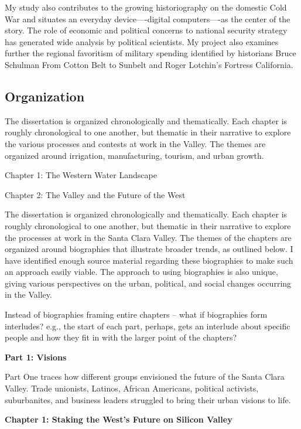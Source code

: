 \documentclass[11pt,article,oneside]{memoir}
\begin{document}
My study also contributes to the growing historiography on the domestic
Cold War and situates an everyday device----digital computers----as the
center of the story. The role of economic and political concerns to
national security strategy has generated wide analysis by political
scientists. My project also examines further the regional favoritism of
military spending identified by historians Bruce Schulman From Cotton
Belt to Sunbelt and Roger Lotchin's Fortress California.

\subsection{Organization}

The dissertation is organized chronologically and thematically. Each
chapter is roughly chronological to one another, but thematic in their
narrative to explore the various processes and contests at work in the
Valley. The themes are organized around irrigation, manufacturing,
tourism, and urban growth.

Chapter 1: The Western Water Landscape

Chapter 2: The Valley and the Future of the West

The dissertation is organized chronologically and thematically. Each
chapter is roughly chronological to one another, but thematic in their
narrative to explore the processes at work in the Santa Clara Valley.
The themes of the chapters are organized around biographies that
illustrate broader trends, as outlined below. I have identified enough
source material regarding these biographies to make such an approach
easily viable. The approach to using biographies is also unique, giving
various perspectives on the urban, political, and social changes
occurring in the Valley.

Instead of biographies framing entire chapters -- what if biographies
form interludes? e.g., the start of each part, perhaps, gets an
interlude about specific people and how they fit in with the larger
point of the chapters?

\textbf{Part 1: Visions}

Part One traces how different groups envisioned the future of the Santa
Clara Valley. Trade unionists, Latinos, African Americans, political
activists, suburbanites, and business leaders struggled to bring their
urban visions to life.

\textbf{Chapter 1: Staking the West's Future on Silicon Valley}
\end{document}
